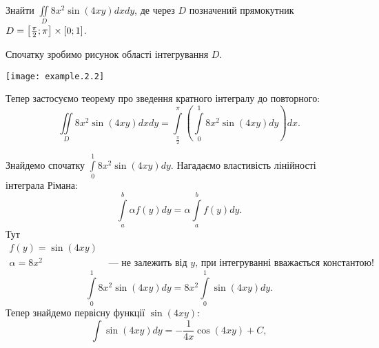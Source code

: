 \begin{example}
Знайти ${\iint\limits_{D}8 x^2 \sin\left(4 x y\right)d x d y}$, де через $D$ позначений пря\-мо\-кут\-ник ${D = \left[\frac{\pi}{2};\pi\right]\times\left[0;1\right]}$.

Спочатку зробимо рисунок області інтегрування $D$.

\texttt{[image: example.2.2]}

Тепер застосуємо теорему про зведення кратного інтегралу до повторного:
\[
\iint\limits_{D}8 x^2 \sin(4 x y)d x d y = \int\limits_{\frac{\pi}{2}}^{\pi}\left(\int\limits_{0}^{1}8 x^2 \sin\left(4 x y\right)d y\right)dx.
\]

Знайдемо спочатку $\int\limits_{0}^{1}8 x^2 \sin\left(4 x y\right)d y$. Нагадаємо властивість лінійності інтеграла Рімана:
\[
\int\limits_{a}^{b}\alpha f(y) d y = \alpha \int\limits_{a}^{b}f(y)d y.
\]
Тут
\[
\begin{array}{cc}
f(y) =  \sin\left(4 x y\right) & \\
\alpha = 8 x^2  & \mbox{ --- не залежить від } y\mbox{, при інтегруванні вважається константою!}
\end{array}
\]
\[
\int\limits_{0}^{1}8 x^2 \sin\left(4 x y\right)d y = 8 x^2 \int\limits_{0}^{1} \sin\left(4 x y\right)d y.
\]
Тепер знайдемо первісну функції ${\sin\left(4 x y\right)}$:
\[
\int\limits \sin\left(4 x y\right)d y = -\frac{1}{4 x}\cos\left(4 x y\right) + C,
\]


\end{example}
